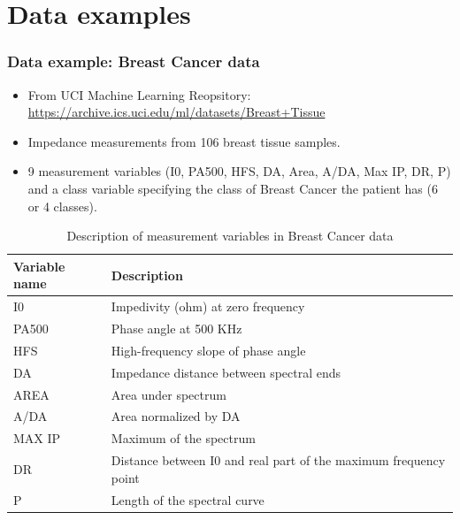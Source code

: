 \documentclass[handout,10pt]{beamer}
\begin{document}
\section{Data examples}
\begin{frame}
\frametitle{Data example: Breast Cancer data}
\begin{itemize}
\item From UCI Machine Learning Reopsitory: \url{https://archive.ics.uci.edu/ml/datasets/Breast+Tissue}
\item Impedance measurements from 106 breast tissue samples.
\item 9 measurement variables (I0, PA500, HFS, DA, Area, A/DA, Max IP, DR, P) and a class variable specifying the class of Breast Cancer the patient has (6 or 4 classes).
\end{itemize}
\begin{scriptsize}
\begin{table}[h]\centering
    \begin{tabular}{l|l}
    \hline
    Variable name & Description          \\\hline
    I0       & Impedivity (ohm) at zero frequency                                \\
    PA500    & Phase angle at 500 KHz                                            \\
    HFS      & High-frequency slope of phase angle                               \\
    DA       & Impedance distance between spectral ends                          \\
    AREA     & Area under spectrum                                               \\
    A/DA     & Area normalized by DA                                             \\
    MAX IP   & Maximum of the spectrum                                           \\
    DR       & Distance between I0 and real part of the maximum frequency point  \\
    P        & Length of the spectral curve                                      \\\hline
    \end{tabular}
    \caption{Description of measurement variables in Breast Cancer data}
\end{table}
\end{scriptsize}
\end{frame}
\end{document}
